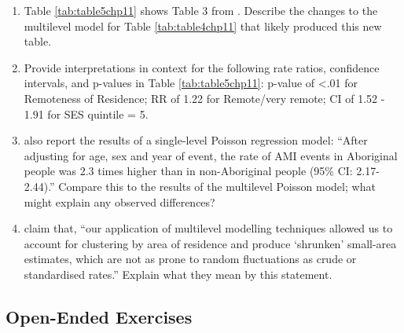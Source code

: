 \documentclass[
]{krantz}
\begin{document}
\begin{enumerate}
\def\labelenumi{\arabic{enumi}.}
\setcounter{enumi}{24}
\item
  Table \ref{tab:table5chp11} shows Table 3 from \citet{Randall2014}. Describe the changes to the multilevel model for Table \ref{tab:table4chp11} that likely produced this new table.
\item
  Provide interpretations in context for the following rate ratios, confidence intervals, and p-values in Table \ref{tab:table5chp11}: p-value of \textless.01 for Remoteness of Residence; RR of 1.22 for Remote/very remote; CI of 1.52 - 1.91 for SES quintile = 5.
\item
  \citet{Randall2014} also report the results of a single-level Poisson regression model: ``After adjusting for age, sex and year of event, the rate of AMI events in Aboriginal people was 2.3 times higher than in non-Aboriginal people (95\% CI: 2.17-2.44).'' Compare this to the results of the multilevel Poisson model; what might explain any observed differences?
\item
  \citet{Randall2014} claim that, ``our application of multilevel modelling techniques allowed us to account for clustering by area of residence and produce `shrunken' small-area estimates, which are not as prone to random fluctuations as crude or standardised rates.'' Explain what they mean by this statement.
\end{enumerate}

\subsection{Open-Ended Exercises}\label{open-ended-exercises-7}
\end{document}
